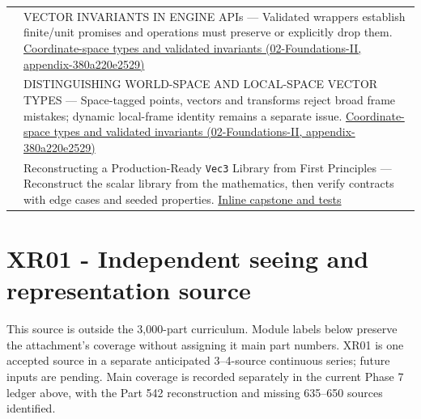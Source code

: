 {\begin{longtable}[]{@{}
  >{\raggedright\arraybackslash}p{}
  >{\raggedright\arraybackslash}p{}@{}}
598 & VECTOR INVARIANTS IN ENGINE APIs --- Validated wrappers establish finite/unit promises and operations must preserve or explicitly drop them. \href{../02-Foundations-II/main.pdf\#nameddest=appendix-380a220e2529}{Coordinate-space types and validated invariants (02-Foundations-II, appendix-380a220e2529)} \\
599 & DISTINGUISHING WORLD-SPACE AND LOCAL-SPACE VECTOR TYPES --- Space-tagged points, vectors and transforms reject broad frame mistakes; dynamic local-frame identity remains a separate issue. \href{../02-Foundations-II/main.pdf\#nameddest=appendix-380a220e2529}{Coordinate-space types and validated invariants (02-Foundations-II, appendix-380a220e2529)} \\
600 & Reconstructing a Production-Ready \texttt{Vec3} Library from First Principles --- Reconstruct the scalar library from the mathematics, then verify contracts with edge cases and seeded properties. \href{Continuous\%20Notes/Computing\%20Foundations\%20-\%20From\%20Bits\%20to\%20C++\%20and\%20Systems\%20APIs\#A\%20complete\%20scalar\%20laboratory\%20makes\%20the\%20story\%20executable/}{Inline capstone and tests} \\
\end{longtable}
}

\section{XR01 - Independent seeing and representation source}\label{appendix-fd090d982a15-xr01---independent-seeing-and-representation-source}

This source is outside the 3,000-part curriculum. Module labels below preserve the attachment's coverage without assigning it main part numbers. XR01 is one accepted source in a separate anticipated 3--4-source continuous series; future inputs are pending. Main coverage is recorded separately in the current Phase 7 ledger above, with the Part 542 reconstruction and missing 635--650 sources identified.

